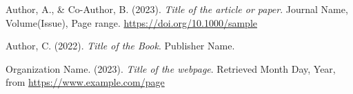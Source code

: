 {}

% 
\renewcommand{\bibname}{References} %
\begin{thebibliography}{99}
    Author, A., \& Co-Author, B. (2023). 
    \textit{Title of the article or paper}. 
    Journal Name, Volume(Issue), Page range. 
    \href{https://doi.org/10.1000/sample}{https://doi.org/10.1000/sample}
    
    Author, C. (2022). 
    \textit{Title of the Book}. 
    Publisher Name.
    
    Organization Name. (2023). 
    \textit{Title of the webpage}. 
    Retrieved Month Day, Year, from \url{https://www.example.com/page}
\end{thebibliography}
